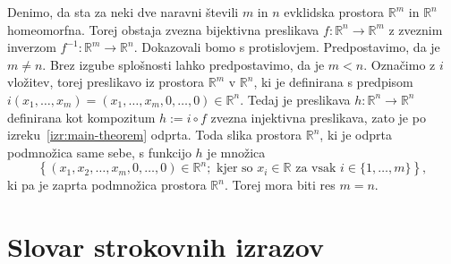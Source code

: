 \documentclass[mat1]{fmfdelo}
\newcommand{\literatura}{literatura}  %
\newcommand{\R}{\mathbb R}
\newcommand{\0}{0}
\begin{document}
\begin{dokaz}
Denimo, da sta za neki dve naravni števili $m$ in $n$ evklidska prostora $\R^m$ in $\R^n$ homeomorfna. Torej obstaja zvezna bijektivna preslikava $f : \R^n \to \R^m$ z zveznim inverzom $f^{-1} : \R^m \to \R^n$. Dokazovali bomo s protislovjem. Predpostavimo, da je $m \neq n$. Brez izgube splošnosti lahko predpostavimo, da je $m < n$. Označimo z $i$ vložitev, torej preslikavo iz prostora $\R^m$ v $\R^n$, ki je definirana s predpisom $i(x_1, \dots, x_m) = (x_1, \dots, x_m, 0, \dots, 0) \in \R^n$. Tedaj je preslikava $h : \R^n \to \R^n$ definirana kot kompozitum $h := i \circ f$ zvezna injektivna preslikava, zato je po izreku~\ref{izr:main-theorem} odprta. Toda slika prostora $\R^n$, ki je odprta podmnožica same sebe, s funkcijo $h$ je množica 
$$\left \{ (x_1, x_2, \dots, x_m, 0, \dots, 0) \in \R^n ; \text{ kjer so } x_i \in \R \text{ za vsak } i \in \{1, \dots, m \}  \right \},$$
 ki pa je zaprta podmnožica prostora $\R^n$. Torej mora biti res $m = n$.
\end{dokaz}
\section*{Slovar strokovnih izrazov}



        
\end{document}
